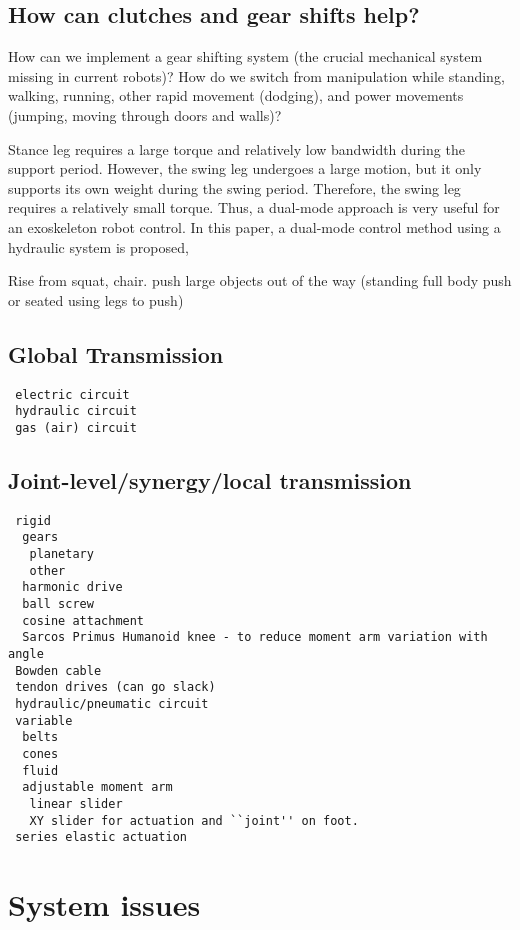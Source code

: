 \documentclass[letterpaper,12pt,fullpage]{article}
\begin{document}
\subsection{How can clutches and gear shifts help?}

How can we implement a gear shifting system (the crucial mechanical
system missing in current robots)? How do we switch from manipulation
while standing, walking, running, other rapid movement (dodging), and
power movements (jumping, moving through doors and walls)?

Stance leg requires a large torque and
relatively low bandwidth during the support period. However,
the swing leg undergoes a large motion, but it only supports
its own weight during the swing period. Therefore, the swing
leg requires a relatively small torque. Thus, a dual-mode
approach is very useful for an exoskeleton robot control.
In this paper, a dual-mode control method using a hydraulic
system is proposed,~\cite{IEEE07222598}

Rise from squat, chair.
push large objects out of the way (standing full body push
or seated using legs to push)

\subsection{Global Transmission}

\begin{verbatim}
 electric circuit
 hydraulic circuit
 gas (air) circuit
\end{verbatim}

\subsection{Joint-level/synergy/local transmission}

\begin{verbatim}
 rigid
  gears
   planetary
   other
  harmonic drive
  ball screw
  cosine attachment
  Sarcos Primus Humanoid knee - to reduce moment arm variation with angle
 Bowden cable
 tendon drives (can go slack)
 hydraulic/pneumatic circuit
 variable
  belts
  cones
  fluid
  adjustable moment arm
   linear slider
   XY slider for actuation and ``joint'' on foot.
 series elastic actuation
\end{verbatim}

\section{System issues}
\end{document}
